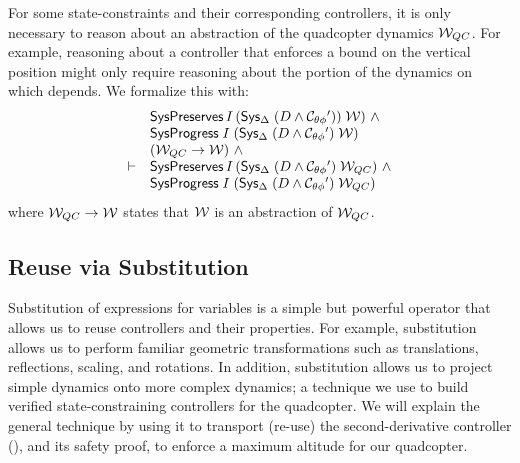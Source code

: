 For some state-constraints and their corresponding controllers, it is only
necessary to reason about an abstraction of the quadcopter dynamics
$\mathcal{W}_{QC}$.  For example, reasoning about a controller that enforces a bound
on the vertical position  might only require reasoning about the
portion of the dynamics on which  depends.  We formalize this
with:
\[\begin{array}{rl}
 & \mathsf{SysPreserves}\,I\,({\textsf{Sys}}{}_{\Delta}\;(D\wedge\mathcal{C}_{\theta\phi}{}^\prime))\;\mathcal{W})~\wedge \\
 & \mathsf{SysProgress{}}\;I\;({\textsf{Sys}}{}_{\Delta}\;(D\wedge\mathcal{C}_{\theta\phi}{}^\prime)\;\mathcal{W}) \\
 & (\mathcal{W}_{QC} \rightarrow \mathcal{W})~\wedge \\
\vdash & \mathsf{SysPreserves}\,I\,({\textsf{Sys}}{}_{\Delta}\;(D\wedge\mathcal{C}_{\theta\phi}{}^\prime)\;\mathcal{W}_{QC})~\wedge \\
 & \mathsf{SysProgress{}}\;I\;({\textsf{Sys}}{}_{\Delta}\;(D\wedge\mathcal{C}_{\theta\phi}{}^\prime)\;\mathcal{W}_{QC})
\end{array}
\]
where $\mathcal{W}_{QC} \rightarrow \mathcal{W}$ states that $\mathcal{W}$ is an abstraction of
$\mathcal{W}_{QC}$.

\subsection{Reuse via Substitution}
\label{sec:simulation}
\label{sec:subst}
Substitution of expressions for variables is a simple but powerful operator
that allows us to reuse controllers and their properties.  For example,
substitution allows us to perform familiar geometric transformations such
as translations, reflections, scaling, and rotations.  In addition,
substitution allows us to project simple dynamics onto more complex
dynamics; a technique we use to build verified state-constraining
controllers for the quadcopter.  We will explain the general technique by
using it to transport (re-use) the second-derivative controller
(\derivShimx), and its safety proof, to enforce a maximum altitude for our
quadcopter.

